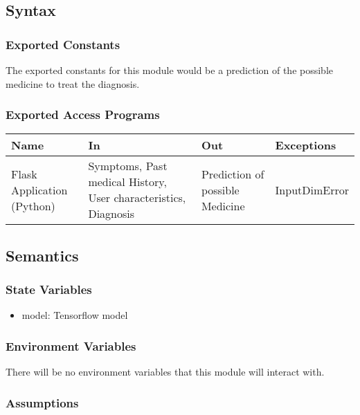\documentclass[12pt, titlepage]{article}
\begin{document}
\subsection{Syntax}

\subsubsection{Exported Constants}
The exported constants for this module would be a prediction of the possible medicine to treat the diagnosis.

\subsubsection{Exported Access Programs}

\begin{center}
\begin{tabular}{p{2cm} p{4cm} p{4cm} p{2cm}}
\hline
\textbf{Name} & \textbf{In} & \textbf{Out} & \textbf{Exceptions} \\
\hline
Flask Application (Python) & Symptoms, Past medical History, User characteristics, Diagnosis & Prediction of possible Medicine & InputDimError \\
\hline
\end{tabular}
\end{center}

\subsection{Semantics}

\subsubsection{State Variables}

\begin{itemize}
  \item model: Tensorflow model
\end{itemize}

\subsubsection{Environment Variables}

There will be no environment variables that this module will interact with.

\subsubsection{Assumptions}
\end{document}

